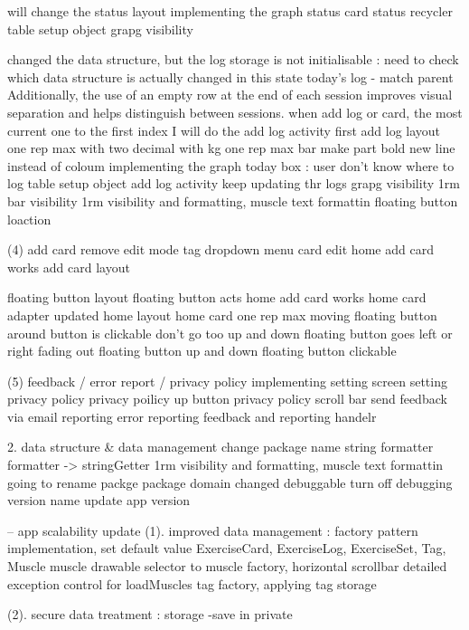 will change the status layout
implementing the graph
status card
status recycler
table setup object
grapg visibility


changed the data structure, but the log storage is not initialisable 
\todo : need to check which data structure is actually changed in this state
today's log - match parent
Additionally, the use of an empty row at the end of each session improves visual separation and helps distinguish between sessions.
when add log or card, the most current one to the first index
I will do the add log activity first
add log layout
one rep max with two decimal with kg
one rep max bar
make part bold
new line instead of coloum
implementing the graph
today box : user don't know where to log
table setup object
add log activity keep updating thr logs
grapg visibility
1rm bar visibility
1rm visibility and formatting, muscle text formattin
floating button loaction


(4) add card 
remove edit mode
tag dropdown menu
card edit
home add card works
add card layout

floating button layout 
floating button acts
home add card works
home card adapter updated
home layout
home card one rep max
moving floating button around
button is clickable
don't go too up and down
floating button goes left or right
fading out
floating button up and down
floating button clickable



(5) feedback / error report / privacy policy
implementing setting screen
setting privacy policy
privacy poilicy up button
privacy policy scroll bar
send feedback via email
reporting
error reporting
feedback and reporting handelr


2. data structure & data management 
change package name
string formatter
formatter -> stringGetter
1rm visibility and formatting, muscle text formattin
going to rename packge
package domain changed
debuggable
turn off debugging
version name update
app version

-- app scalability update
(1). improved data management : factory pattern implementation, set default value 
    ExerciseCard, ExerciseLog, ExerciseSet, Tag, Muscle
    muscle drawable selector to muscle factory, horizontal scrollbar
detailed exception control for loadMuscles
    tag factory, applying tag storage

(2). secure data treatment : storage -save in private

